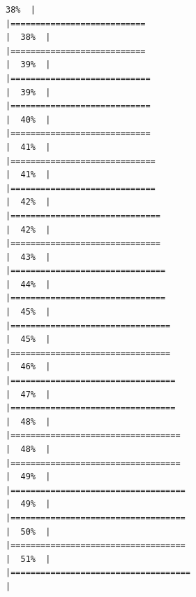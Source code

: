 \documentclass[
  english,
  man,a4paper,mask,floatsintext]{apa6}
\begin{document}
\begin{verbatim}
38%  |                                                                              |===========================                                           |  38%  |                                                                              |===========================                                           |  39%  |                                                                              |============================                                          |  39%  |                                                                              |============================                                          |  40%  |                                                                              |============================                                          |  41%  |                                                                              |=============================                                         |  41%  |                                                                              |=============================                                         |  42%  |                                                                              |==============================                                        |  42%  |                                                                              |==============================                                        |  43%  |                                                                              |===============================                                       |  44%  |                                                                              |===============================                                       |  45%  |                                                                              |================================                                      |  45%  |                                                                              |================================                                      |  46%  |                                                                              |=================================                                     |  47%  |                                                                              |=================================                                     |  48%  |                                                                              |==================================                                    |  48%  |                                                                              |==================================                                    |  49%  |                                                                              |===================================                                   |  49%  |                                                                              |===================================                                   |  50%  |                                                                              |===================================                                   |  51%  |                                                                              |====================================                                  |  
\end{verbatim}
\end{document}
